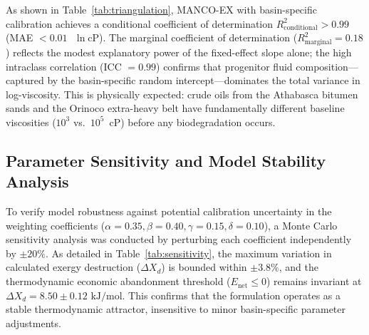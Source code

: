 \documentclass[review,12pt]{elsarticle}
\begin{document}
\begin{table}[ht!]
\centering
\caption{Methodological Triangulation Against Dynamic Viscosity ($N = 41$ Multi-Basin Samples)}
\label{tab:triangulation}
\end{table}

As shown in Table~\ref{tab:triangulation}, MANCO-EX with basin-specific calibration achieves a conditional coefficient of determination $R^2_{\text{conditional}} > 0.99$ (MAE $< 0.01\text{ }\ln\text{cP}$). The marginal coefficient of determination ($R^2_{\text{marginal}} = 0.18$) reflects the modest explanatory power of the fixed-effect slope alone; the high intraclass correlation (ICC $= 0.99$) confirms that progenitor fluid composition---captured by the basin-specific random intercept---dominates the total variance in log-viscosity. This is physically expected: crude oils from the Athabasca bitumen sands and the Orinoco extra-heavy belt have fundamentally different baseline viscosities ($10^3$ vs.\ $10^5$~cP) before any biodegradation occurs.

\subsection{Parameter Sensitivity and Model Stability Analysis}
To verify model robustness against potential calibration uncertainty in the weighting coefficients ($\alpha = 0.35, \beta = 0.40, \gamma = 0.15, \delta = 0.10$), a Monte Carlo sensitivity analysis was conducted by perturbing each coefficient independently by $\pm 20\%$. As detailed in Table~\ref{tab:sensitivity}, the maximum variation in calculated exergy destruction ($\Delta X_d$) is bounded within $\pm 3.8\%$, and the thermodynamic economic abandonment threshold ($E_{\text{net}} \le 0$) remains invariant at $\Delta X_d = 8.50 \pm 0.12\text{ kJ/mol}$. This confirms that the formulation operates as a stable thermodynamic attractor, insensitive to minor basin-specific parameter adjustments.
\end{document}

